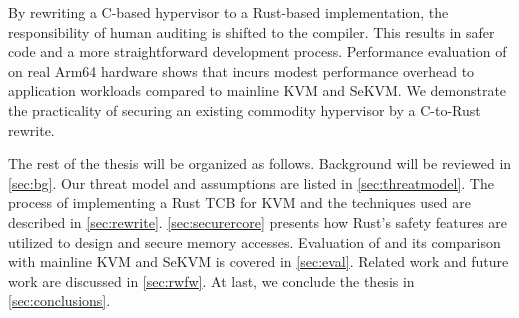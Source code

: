 By rewriting a C-based hypervisor to a Rust-based implementation,
the responsibility of human auditing is shifted to the compiler.
This results in safer code and a more straightforward development process.
Performance evaluation of \rustsec{} on real Arm64 hardware shows that
\rustsec{} incurs modest performance overhead to application workloads
compared to mainline KVM and SeKVM. We demonstrate the practicality of
securing an existing commodity hypervisor by a C-to-Rust rewrite.

The rest of the thesis will be organized as follows. Background
will be reviewed in \autoref{sec:bg}. Our threat model and assumptions are
listed in \autoref{sec:threatmodel}. The process of implementing a Rust TCB
for KVM and the techniques used are described in \autoref{sec:rewrite}.
\autoref{sec:securercore} presents how Rust's safety features are utilized to
design and secure \rustcore{} memory accesses.
Evaluation of \rustsec{} and its comparison with mainline KVM and SeKVM is
covered in \autoref{sec:eval}. Related work and future work are discussed in
\autoref{sec:rwfw}. At last, we conclude the thesis in
\autoref{sec:conclusions}.
